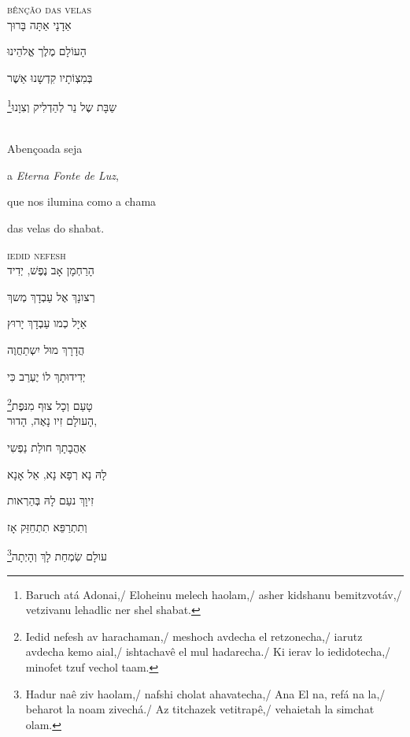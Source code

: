 \textsc{bênção das velas}\\[15pt]

אַדָנָי אַתָּה בָּרוּך

הָעוֹלָם מֶלֶך אֱלהֵינוּ

בְּמִצְוֹתָיו קִדְשָנוּ אַשֶׁר

שַבָּת שֶל נֵר לְהַדְלִיק וְצִוָנוּ‏\footnote{Baruch atá Adonai,/ Eloheinu melech haolam,/ asher kidshanu bemitzvotáv,/ vetzivanu lehadlic ner shel shabat.}

\movetooddpage
\raggedright

\vspace*{1cm}

\textsc{}\\[15pt]

Abençoada seja

a \emph{Eterna Fonte de Luz}, 

que nos ilumina como a chama

das velas do shabat. 


\movetoevenpage
\raggedleft

\vspace*{1cm}

\textsc{iedid nefesh}\\[15pt]

הָרַחְמָן אָב נֶפֶשׁ, יְדִיד 

רְצונָךְ אֶל עַבְדָךְ מְשךְ 

אַיָל כְמו עַבְדָךְ יָרוּץ 

הֲדָרָךְ מוּל יִשְתַחֲוֶה 

יְדִידוּתָךְ לוֹ יֶעְרַב כִּי 

טָעַם וְכָל צוּף מִנּפֶת\footnote{Iedid nefesh av harachaman,/ meshoch avdecha el retzonecha,/ iarutz avdecha kemo aial,/ ishtachavê el mul hadarecha./ Ki ierav lo iedidotecha,/ minofet tzuf vechol taam.}\\[10pt]

הָעולָם זִיו נָאֶה, הָדוּר,

אַהֲבָתָךְ חולַת נַפְשִי 

לָהּ נָא רְפָא נָא, אֵל אָנָא 

זִיוָךְ נעַם לָהּ בְּהַרְאות

וְתִתְרַפֵּא תִתְחֵזֵּק אָז

עולָם שִׂמְחַת לָךְ וְהָיְתָה\footnote{Hadur naê ziv haolam,/ nafshi cholat ahavatecha,/ Ana El na, refá na la,/ beharot la noam zivechá./ Az titchazek vetitrapê,/ vehaietah la simchat olam.}\\[10pt]


